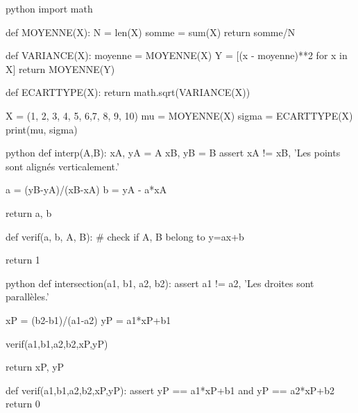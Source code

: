 \newif\ifdys
				\dystrue
				\dysfalse

\newif\ifsolutions
				\solutionstrue
				\solutionsfalse



\AdvanceDate[0]


\pagestyle{fancy}
\fancyhead[C]{\textbf{Algorithmique : applications \ifsolutions \, -- Solutions  \fi}}
\fancyhead[R]{\today}


\exe{[Statistiques]
}{}

\begin{mintedbox}{python}
import math

def MOYENNE(X):
	N = len(X)
	somme = sum(X)
	return somme/N

def VARIANCE(X):
	moyenne = MOYENNE(X)
	Y = [(x - moyenne)**2 for x in X]
	return MOYENNE(Y)

def ECARTTYPE(X):
	return math.sqrt(VARIANCE(X))

X = (1, 2, 3, 4, 5, 6,7, 8, 9, 10)
mu = MOYENNE(X)
sigma = ECARTTYPE(X)
print(mu, sigma)
\end{mintedbox}



\begin{mintedbox}{python}
def interp(A,B):
	xA, yA = A
	xB, yB = B
	assert xA != xB, 'Les points sont alignés verticalement.'
	
	a = (yB-yA)/(xB-xA)
	b = yA - a*xA
	
	return a, b
	
def verif(a, b, A, B):
	# check if A, B belong to y=ax+b
	
	return 1	
\end{mintedbox}


\begin{mintedbox}{python}
def intersection(a1, b1, a2, b2):
	assert a1 != a2, 'Les droites sont parallèles.'
	
	xP =  (b2-b1)/(a1-a2)
	yP = a1*xP+b1
	
	verif(a1,b1,a2,b2,xP,yP)
	
	return xP, yP
	
def verif(a1,b1,a2,b2,xP,yP):
	assert yP == a1*xP+b1 and yP == a2*xP+b2
	return 0
\end{mintedbox}

